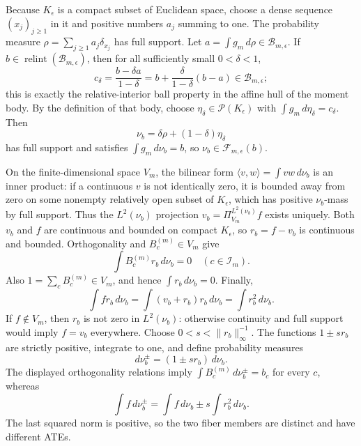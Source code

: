 Because \(K_{\epsilon}\) is a compact subset of Euclidean space, choose a dense sequence \((x_j)_{j\geq1}\) in it and positive numbers \(a_j\) summing to one.  The probability measure \(\rho=\sum_{j\geq1}a_j\delta_{x_j}\) has full support.  Let \(a=\int g_m\,d\rho\in\mathcal B_{m,\epsilon}\).  If \(b\in\operatorname{relint}(\mathcal B_{m,\epsilon})\), then for all sufficiently small \(0<\delta<1\),
\[
 c_{\delta}=\frac{b-\delta a}{1-\delta}
 =b+\frac{\delta}{1-\delta}(b-a)
 \in\mathcal B_{m,\epsilon};
\]
this is exactly the relative-interior ball property in the affine hull of the moment body.  By the definition of that body, choose \(\eta_{\delta}\in\mathcal P(K_{\epsilon})\) with \(\int g_m\,d\eta_{\delta}=c_{\delta}\).  Then
\[
 \nu_b=\delta\rho+(1-\delta)\eta_{\delta}
\]
has full support and satisfies \(\int g_m\,d\nu_b=b\), so \(\nu_b\in\mathcal F_{m,\epsilon}(b)\).

On the finite-dimensional space \(V_m\), the bilinear form \(\langle v,w\rangle=\int vw\,d\nu_b\) is an inner product: if a continuous \(v\) is not identically zero, it is bounded away from zero on some nonempty relatively open subset of \(K_{\epsilon}\), which has positive \(\nu_b\)-mass by full support.  Thus the \(L^2(\nu_b)\) projection \(v_b=\Pi_{V_m}^{L^2(\nu_b)}f\) exists uniquely.  Both \(v_b\) and \(f\) are continuous and bounded on compact \(K_{\epsilon}\), so \(r_b=f-v_b\) is continuous and bounded.  Orthogonality and \(B_c^{(m)}\in V_m\) give
\[
 \int B_c^{(m)}r_b\,d\nu_b=0\quad(c\in\mathcal I_m).
\]
Also \(1=\sum_cB_c^{(m)}\in V_m\), and hence \(\int r_b\,d\nu_b=0\).  Finally,
\[
 \int fr_b\,d\nu_b
 =\int(v_b+r_b)r_b\,d\nu_b
 =\int r_b^2\,d\nu_b.
\]
If \(f\notin V_m\), then \(r_b\) is not zero in \(L^2(\nu_b)\): otherwise continuity and full support would imply \(f=v_b\) everywhere.  Choose \(0<s<\|r_b\|_{\infty}^{-1}\).  The functions \(1\pm sr_b\) are strictly positive, integrate to one, and define probability measures
\[
 d\nu_b^{\pm}=(1\pm sr_b)\,d\nu_b.
\]
The displayed orthogonality relations imply \(\int B_c^{(m)}\,d\nu_b^{\pm}=b_c\) for every \(c\), whereas
\[
 \int f\,d\nu_b^{\pm}
 =\int f\,d\nu_b\pm s\int r_b^2\,d\nu_b.
\]
The last squared norm is positive, so the two fiber members are distinct and have different ATEs.